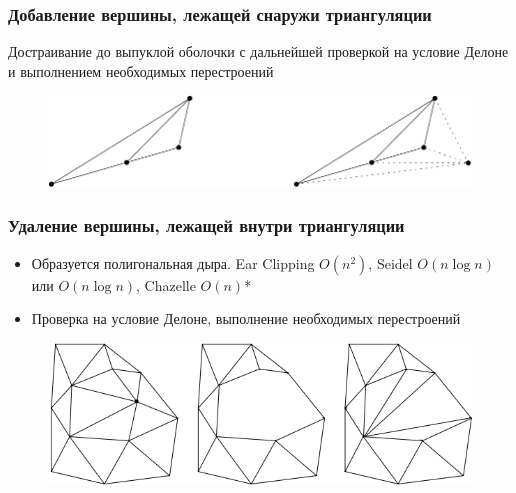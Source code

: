 \documentclass[10pt, unicode]{beamer}
\begin{document}
    \begin{frame}
        \frametitle{Добавление вершины, лежащей снаружи триангуляции}
        Достраивание до выпуклой оболочки с дальнейшей проверкой на условие Делоне и выполнением необходимых перестроений
        \begin{figure}[H]
            \centering
            \includegraphics[scale=0.5]{AddOutOfTriangulationVertex.png}
        \end{figure}
    \end{frame}
    \begin{frame}
        \frametitle{Удаление вершины, лежащей внутри триангуляции}
        \begin{itemize}
            \item Образуется полигональная дыра. Ear Clipping $O(n^2)$, Seidel $O(n\log n)$ или $O(n\log n)$, 
            Chazelle $O(n)$*
            \item Проверка на условие Делоне, выполнение необходимых перестроений
        \end{itemize}
        \begin{figure}[H]
            \centering
            \includegraphics[scale=0.5]{DeleteInsideVertex.png}
        \end{figure}
    \end{frame}
\end{document}
